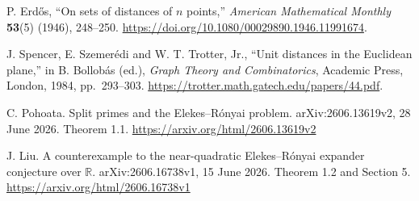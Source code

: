 P. Erd\H{o}s, ``On sets of distances of $n$ points,'' \emph{American Mathematical Monthly} \textbf{53}(5) (1946), 248--250.
\url{https://doi.org/10.1080/00029890.1946.11991674}.

J. Spencer, E. Szemer\'edi and W. T. Trotter, Jr., ``Unit distances in the Euclidean plane,'' in B. Bollob\'as (ed.), \emph{Graph Theory and Combinatorics}, Academic Press, London, 1984, pp.~293--303.
\url{https://trotter.math.gatech.edu/papers/44.pdf}.

C. Pohoata. Split primes and the Elekes--R\'onyai problem. arXiv:2606.13619v2, 28 June 2026. Theorem 1.1. \url{https://arxiv.org/html/2606.13619v2}

J. Liu. A counterexample to the near-quadratic Elekes--R\'onyai expander conjecture over $\mathbb R$. arXiv:2606.16738v1, 15 June 2026. Theorem 1.2 and Section 5. \url{https://arxiv.org/html/2606.16738v1}